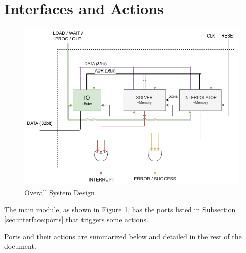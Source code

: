 \documentclass[12pt]{report}
\begin{document}
\section{Interfaces and Actions}
\begin{center}
    \begin{figure}[hp]
        \centering
        \includegraphics[width=\textwidth]{d1}
        \caption{Overall System Design}
        \label{fig:overall}
    \end{figure}
\end{center}

The main module, as shown in Figure \ref{fig:overall}, has the ports listed in Subsection \ref{sec:interface:ports} that triggers some actions. 

Ports and their actions are summarized below and detailed in the rest of the document.
\end{document}
